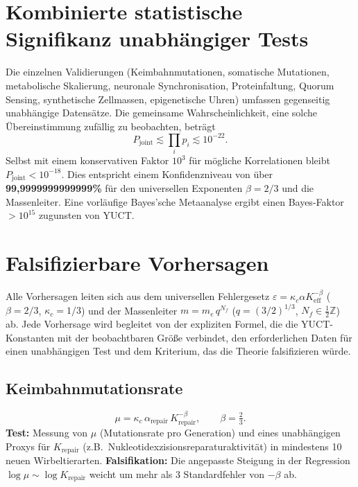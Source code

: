 \documentclass[11pt,a4paper]{article}
\begin{document}
	\section{Kombinierte statistische Signifikanz unabhängiger Tests}
	
	Die einzelnen Validierungen (Keimbahnmutationen, somatische Mutationen, metabolische Skalierung, neuronale Synchronisation, Proteinfaltung, Quorum Sensing, synthetische Zellmassen, epigenetische Uhren) umfassen gegenseitig unabhängige Datensätze. Die gemeinsame Wahrscheinlichkeit, eine solche Übereinstimmung zufällig zu beobachten, beträgt
	\[
	P_{\text{joint}} \lesssim \prod_i p_i \lesssim 10^{-22}.
	\]
	Selbst mit einem konservativen Faktor \(10^3\) für mögliche Korrelationen bleibt \(P_{\text{joint}} < 10^{-18}\). Dies entspricht einem Konfidenzniveau von über \textbf{99,9999999999999\%} für den universellen Exponenten \(\beta=2/3\) und die Massenleiter. Eine vorläufige Bayes'sche Metaanalyse ergibt einen Bayes-Faktor \(>10^{15}\) zugunsten von YUCT.
	
	\section{Falsifizierbare Vorhersagen}
	
	Alle Vorhersagen leiten sich aus dem universellen Fehlergesetz
	\(\varepsilon = \kappa_c \alpha K_{\mathrm{eff}}^{-\beta}\)
	(\(\beta=2/3\), \(\kappa_c=1/3\)) und der Massenleiter
	\(m = m_e\,q^{N_f}\) (\(q=(3/2)^{1/3}\), \(N_f\in\tfrac12\mathbb{Z}\)) ab.
	Jede Vorhersage wird begleitet von der expliziten Formel, die die YUCT-Konstanten mit der beobachtbaren Größe verbindet, den erforderlichen Daten für einen unabhängigen Test und dem Kriterium, das die Theorie falsifizieren würde.
	
	\subsection{Keimbahnmutationsrate}
	
	\begin{equation}\label{eq:pred-mutation}
		\mu = \kappa_c\,\alpha_{\mathrm{repair}}\,
		K_{\mathrm{repair}}^{-\beta}, \qquad \beta = \tfrac23 .
	\end{equation}
	\textbf{Test:} Messung von \(\mu\) (Mutationsrate pro Generation) und eines unabhängigen Proxys für \(K_{\mathrm{repair}}\) (z.B.\ Nukleotidexzisionsreparaturaktivität) in mindestens 10 neuen Wirbeltierarten.
	\textbf{Falsifikation:} Die angepasste Steigung in der Regression
	\(\log\mu \sim \log K_{\mathrm{repair}}\) weicht um mehr als 3 Standardfehler von \(-\beta\) ab.
	
\end{document}
